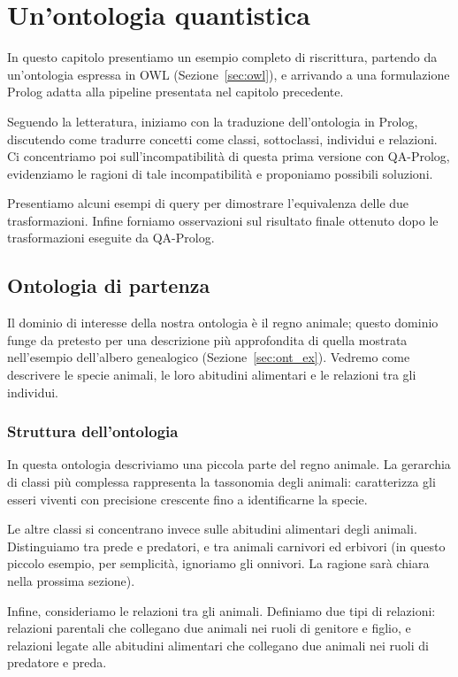 \chapter{Un'ontologia quantistica}
\label{ch:qa_ont}
In questo capitolo presentiamo un esempio completo di riscrittura, partendo da un'ontologia espressa in OWL (Sezione~\ref{sec:owl}), e arrivando a una formulazione Prolog adatta alla pipeline presentata nel capitolo precedente.

Seguendo la letteratura, iniziamo con la traduzione dell'ontologia in Prolog, discutendo come tradurre concetti come classi, sottoclassi, individui e relazioni. Ci concentriamo poi sull'incompatibilità di questa prima versione con QA-Prolog, evidenziamo le ragioni di tale incompatibilità e proponiamo possibili soluzioni.

Presentiamo alcuni esempi di query per dimostrare l'equivalenza delle due trasformazioni. Infine forniamo osservazioni sul risultato finale ottenuto dopo le trasformazioni eseguite da QA-Prolog.

\section{Ontologia di partenza}
Il dominio di interesse della nostra ontologia è il regno animale; questo dominio funge da pretesto per una descrizione più approfondita di quella mostrata nell'esempio dell'albero genealogico (Sezione~\ref{sec:ont_ex}). Vedremo come descrivere le specie animali, le loro abitudini alimentari e le relazioni tra gli individui.

\subsection{Struttura dell'ontologia}
In questa ontologia descriviamo una piccola parte del regno animale. La gerarchia di classi più complessa rappresenta la tassonomia degli animali: caratterizza gli esseri viventi con precisione crescente fino a identificarne la specie.

Le altre classi si concentrano invece sulle abitudini alimentari degli animali. Distinguiamo tra prede e predatori, e tra animali carnivori ed erbivori (in questo piccolo esempio, per semplicità, ignoriamo gli onnivori. La ragione sarà chiara nella prossima sezione).

Infine, consideriamo le relazioni tra gli animali. Definiamo due tipi di relazioni: relazioni parentali che collegano due animali nei ruoli di genitore e figlio, e relazioni legate alle abitudini alimentari che collegano due animali nei ruoli di predatore e preda.

